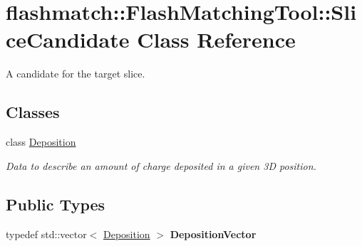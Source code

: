 \hypertarget{classflashmatch_1_1FlashMatchingTool_1_1SliceCandidate}{\section{flashmatch\-:\-:Flash\-Matching\-Tool\-:\-:Slice\-Candidate Class Reference}
\label{classflashmatch_1_1FlashMatchingTool_1_1SliceCandidate}
}


A candidate for the target slice.  


\subsection*{Classes}
\begin{DoxyCompactItemize}
\item 
class \hyperlink{classflashmatch_1_1FlashMatchingTool_1_1SliceCandidate_1_1Deposition}{Deposition}
\begin{DoxyCompactList}\small\item\em Data to describe an amount of charge deposited in a given 3\-D position. \end{DoxyCompactList}\end{DoxyCompactItemize}
\subsection*{Public Types}
\begin{DoxyCompactItemize}
\item 
\hypertarget{classflashmatch_1_1FlashMatchingTool_1_1SliceCandidate_aa57131c7a2914bae3315c3dae1dc9e9f}{typedef std\-::vector$<$ \hyperlink{classflashmatch_1_1FlashMatchingTool_1_1SliceCandidate_1_1Deposition}{Deposition} $>$ {\bfseries Deposition\-Vector}}\label{classflashmatch_1_1FlashMatchingTool_1_1SliceCandidate_aa57131c7a2914bae3315c3dae1dc9e9f}

\end{DoxyCompactItemize}
